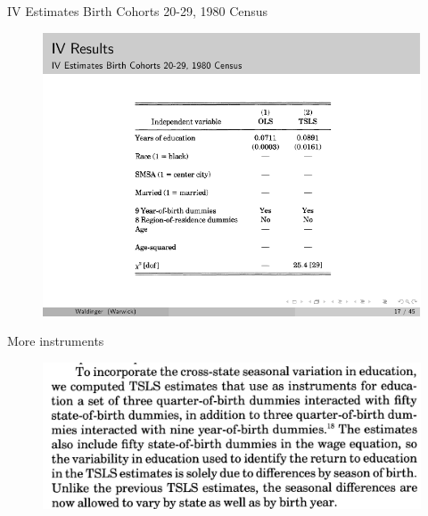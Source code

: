 \documentclass{beamer}
\begin{document}
\begin{frame}{IV Estimates Birth Cohorts 20-29, 1980 Census}
  \begin{figure}
    \includegraphics{./lecture_includes/qob_7.pdf}
  \end{figure}
\end{frame}

\begin{frame}{More instruments}
  \begin{figure}
    \includegraphics[scale=.25]{./lecture_includes/weak_qob1.png}
  \end{figure}
\end{frame}
\end{document}
